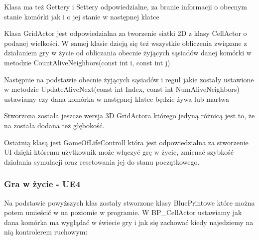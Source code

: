 \documentclass[a4paper,12pt,reqno]{article}
\begin{document}


Klasa ma też Gettery i Settery odpowiedzialne, za branie informacji o obecnym stanie komórki jak i o jej stanie w następnej klatce



Klasa GridActor jest odpowiedzialna za tworzenie siatki 2D z klasy CellActor o podanej wielkości. W samej klasie dzieją się też wszystkie obliczenia związane z działaniem gry w życie od obliczania obecnie żyjących sąsiadów danej komórki w metodzie CountAliveNeighbors(const int i, const int j)



Następnie na podstawie obecnie żyjących sąsiadów i reguł jakie zostały ustawione w metodzie UpdateAliveNext(const int Index, const int NumAliveNeighbors) ustawiamy czy dana komórka w następnej klatce będzie żywa lub martwa




Stworzona została jeszcze wersja 3D GridActora którego jedyną różnicą jest to, że na została dodana też głębokość.

Ostatnią klasą jest GameOfLifeControll która jest odpowiedzialna
za stworzenie UI dzięki któremu użytkownik może włączyć grę w życie, zmienać szybkość działania symulacji oraz resetowania jej do stanu początkowego.

\subsubsection{Gra w życie - UE4}

Na podstawie powyższych klas zostały stworzone klasy BluePrintowe które można potem umieścić w na poziomie w programie. W BP\_CellActor ustawiamy jak dana komórka ma wyglądać w świecie gry i jak się zachować kiedy najedziemy na nią kontrolerem ruchowym:
\end{document}
